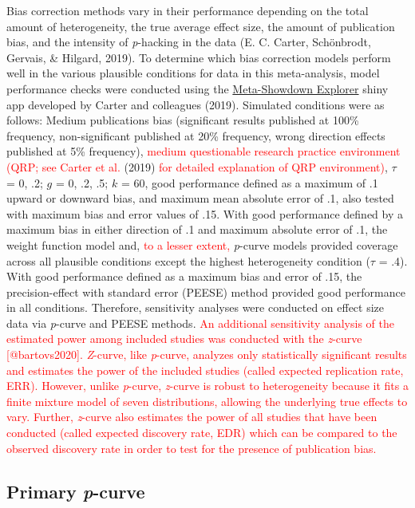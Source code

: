 \documentclass[
  english,
  man,floatsintext]{apa7}
\begin{document}
Bias correction methods vary in their performance depending on the total amount of heterogeneity, the true average effect size, the amount of publication bias, and the intensity of \emph{p}-hacking in the data (E. C. Carter, Schönbrodt, Gervais, \& Hilgard, 2019). To determine which bias correction models perform well in the various plausible conditions for data in this meta-analysis, model performance checks were conducted using the \href{http://www.shinyapps.org/apps/metaExplorer/}{Meta-Showdown Explorer} shiny app developed by Carter and colleagues (2019). Simulated conditions were as follows: Medium publications bias (significant results published at 100\% frequency, non-significant published at 20\% frequency, wrong direction effects published at 5\% frequency), \textcolor{red}{medium questionable research practice environment (QRP; see Carter et al.} (2019) \textcolor{red}{for detailed explanation of QRP environment)}, \(\tau\) = 0, .2; \(g\) = 0, .2, .5; \(k\) = 60, good performance defined as a maximum of .1 upward or downward bias, and maximum mean absolute error of .1, also tested with maximum bias and error values of .15. With good performance defined by a maximum bias in either direction of .1 and maximum absolute error of .1, the weight function model and, \textcolor{red}{to a lesser extent,} \emph{p}-curve models provided coverage across all plausible conditions except the highest heterogeneity condition (\(\tau\) = .4). With good performance defined as a maximum bias and error of .15, the precision-effect with standard error (PEESE) method provided good performance in all conditions. Therefore, sensitivity analyses were conducted on effect size data via \emph{p}-curve and PEESE methods. \textcolor{red}{An additional sensitivity analysis of the estimated power among included studies was conducted with the \emph{z}-curve [@bartovs2020]. \emph{Z}-curve, like \emph{p}-curve, analyzes only statistically significant results and estimates the power of the included studies (called expected replication rate, ERR). However, unlike \emph{p}-curve, \emph{z}-curve is robust to heterogeneity because it fits a finite mixture model of seven distributions, allowing the underlying true effects to vary. Further, \emph{z}-curve also estimates the power of all studies that have been conducted (called expected discovery rate, EDR) which can be compared to the observed discovery rate in order to test for the presence of publication bias.}

\hypertarget{primary-p-curve}{%
\subsection{\texorpdfstring{Primary \emph{p}-curve}{Primary p-curve}}\label{primary-p-curve}}
\end{document}
